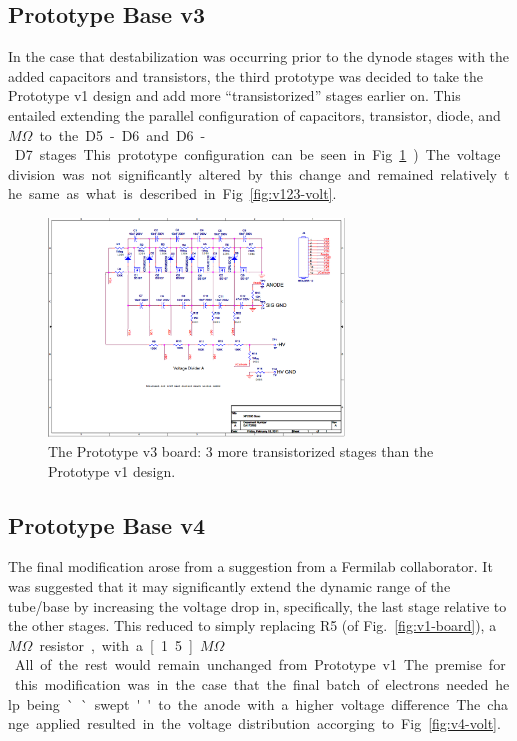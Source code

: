 \subsection{Prototype Base v3}

In the case that destabilization was occurring prior to the dynode stages with the added capacitors and transistors, the third prototype was decided to take the Prototype v1 design and add more ``transistorized'' stages earlier on. This entailed extending the parallel configuration of capacitors, transistor, diode, and \unit[1]{$M\Omega$} to the D5-D6 and D6-D7 stages. This prototype configuration can be seen in Fig.~\ref{fig:v3-board}). The voltage division was not significantly altered by this change and remained relatively the same as what is described in Fig.~\ref{fig:v123-volt}.

\begin{figure}
	\centerline{
		\mbox{\includegraphics[width=0.7\textwidth]{figures/newbase_6mosfet.png}}
	}
	\caption{The Prototype v3 board: 3 more transistorized stages than the Prototype v1 design.}
	\label{fig:v3-board}
\end{figure}

\subsection{Prototype Base v4}

The final modification arose from a suggestion from a Fermilab collaborator. It was suggested that it may significantly extend the dynamic range of the tube/base by increasing the voltage drop in, specifically, the last stage relative to the other stages.  This reduced to simply replacing R5 (of Fig.~\ref{fig:v1-board}), a \unit[1]{$M\Omega$} resistor, with a \unit[1.5]{$M\Omega$}.  All of the rest would remain unchanged from Prototype v1. The premise for this modification was in the case that the final batch of electrons needed help being ``swept'' to the anode with a higher voltage difference. The change applied resulted in the voltage distribution accorging to Fig.~\ref{fig:v4-volt}.

